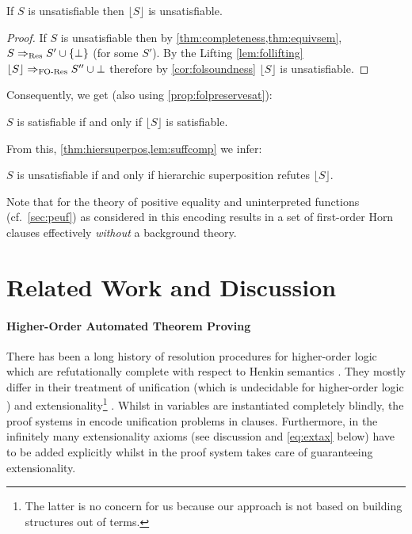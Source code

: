 \documentclass[a4paper,twoside,notitlepage,openright,11pt]{report}
\begin{document}
\begin{corollary}
  If $S$ is unsatisfiable then $\lfloor S\rfloor$ is unsatisfiable.
\end{corollary}
\begin{proof}
  If $S$ is unsatisfiable then by \cref{thm:completeness,thm:equivsem}, $S\Rightarrow_{\operatorname{Res}} S'\cup\{\bot\}$ (for some $S'$). By the Lifting \cref{lem:follifting} $\lfloor S\rfloor\Rightarrow_{\operatorname{{FO-Res}}} S''\cup\bot$ therefore by \cref{cor:folsoundness} $\lfloor S\rfloor$ is unsatisfiable.
\end{proof}

Consequently, we get (also using \cref{prop:folpreservesat}):
\begin{theorem}
  $S$ is satisfiable if and only if $\lfloor S\rfloor$ is satisfiable.
\end{theorem}
From this, \cref{thm:hiersuperpos,lem:suffcomp} we infer:
\begin{corollary}
  $S$ is unsatisfiable if and only if hierarchic superposition refutes $\lfloor S\rfloor$.
\end{corollary}

Note that for the theory of positive equality and uninterpreted functions (cf.\ \cref{sec:peuf}) as considered in \cite{CHRW13} this encoding results in a set of first-order Horn clauses effectively \emph{without} a background theory.

\label{ch:conc}

\section{Related Work and Discussion}
\label{sec:relworkrel}
\paragraph{Higher-Order Automated Theorem Proving}
There has been a long history of resolution procedures for higher-order logic which are refutationally complete with respect to Henkin semantics \cite{A71,H72,BK98}. They mostly differ in their treatment of unification (which is undecidable for higher-order logic \cite{L72,H73,G81}) and extensionality\footnote{The latter is no concern for us because our approach is not based on building structures out of terms.} \cite{B02}. Whilst in \cite{A71} variables are instantiated completely blindly, the proof systems in \cite{H72,BK98} encode unification problems in clauses. Furthermore, in \cite{A71,H72} the infinitely many extensionality axioms (see discussion and \cref{eq:extax} below) have to be added explicitly whilst in \cite{BK98} the proof system takes care of guaranteeing extensionality.
\end{document}
